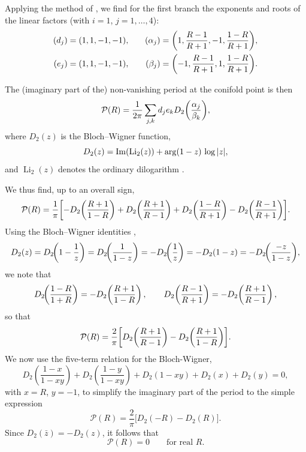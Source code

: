 \documentclass[11pt, a4paper]{article}
\numberwithin{equation}{section}
\begin{document}
Applying the method of \cite[Section~4.2]{kerr2008}, we find for the first branch the exponents and roots of the linear factors (with $i=1$, $j = 1,\dots,4$):
\begin{equation}
  \begin{aligned}
    (d_j) &= (1, 1, -1, -1), &\quad (\alpha_j) = \qty(1,\frac{R-1}{R+1},-1,\frac{1-R}{R+1}), \\
    (e_j) &= (1, 1, -1, -1), &\quad (\beta_j) = \qty(-1,\frac{R-1}{R+1},1,\frac{1-R}{R+1}).
  \end{aligned}
\end{equation}

The (imaginary part of the) non-vanishing period at the conifold point is then
\begin{equation}
  \mathcal{P}(R) = \frac{1}{2\pi} \sum_{j, k} d_j e_k D_2\qty(\frac{\alpha_j}{\beta_k}),
\end{equation}
where $D_2(z)$ is the Bloch--Wigner function,
\begin{equation}
  D_2(z) = \Im\!\qty(\operatorname{Li}_2(z)) + \arg(1-z)\,\log\abs{z},
\end{equation}
and $\operatorname{Li}_2(z)$ denotes the ordinary dilogarithm \cite{zagier:dilogarithm}.

We thus find, up to an overall sign,
\begin{equation}
  \mathcal{P}(R) = \frac{1}{\pi} \qty[-D_2\!\left(\frac{R+1}{1-R}\right)
  + D_2\!\left(\frac{R+1}{R-1}\right)
  + D_2\!\left(\frac{1-R}{R+1}\right)
  - D_2\!\left(\frac{R-1}{R+1}\right)].
\end{equation}
Using the Bloch--Wigner identities \cite[Eq.~(3)]{zagier:dilogarithm},
\begin{equation}
  D_2(z) = D_2\!\qty(1-\frac{1}{z}) = D_2\!\qty(\frac{1}{1-z})
  = -D_2\!\qty(\frac{1}{z}) = -D_2(1-z)
  = -D_2\!\qty(\frac{-z}{1-z}),
\end{equation}
we note that
\begin{equation}
  D_2\!\qty(\frac{1-R}{1+R}) = -D_2\!\left(\frac{R+1}{1-R}\right),
  \qquad
  D_2\!\left(\frac{R-1}{R+1}\right) = -D_2\!\left(\frac{R+1}{R-1}\right),
\end{equation}
so that
\begin{equation}\label{eq:realPeriod}
  \mathcal{P}(R) = \frac{2}{\pi}
  \qty[D_2\!\left(\frac{R+1}{R-1}\right)
  - D_2\!\left(\frac{R+1}{1-R}\right)].
\end{equation}
We now use the five-term relation for the Bloch-Wigner,
\begin{equation}
  D_2\left(\frac{1-x}{1-x y}\right)+D_2\left(\frac{1-y}{1-x y}\right)+D_2(1-x y)+D_2(x)+D_2(y) = 0,
\end{equation}
with $x = R$, $y = -1$, to simplify the imaginary part of the period to the simple expression
\begin{equation}
  \mathcal{P}(R) = \frac{2}{\pi } \bigl[D_2(-R)-D_2(R)\bigr].
\end{equation}
Since $D_2(\bar{z}) = -D_2(z)$, it follows that
\begin{equation}
  \mathcal{P}(R) = 0 \qquad \text{for real } R.
\end{equation}
\end{document}
